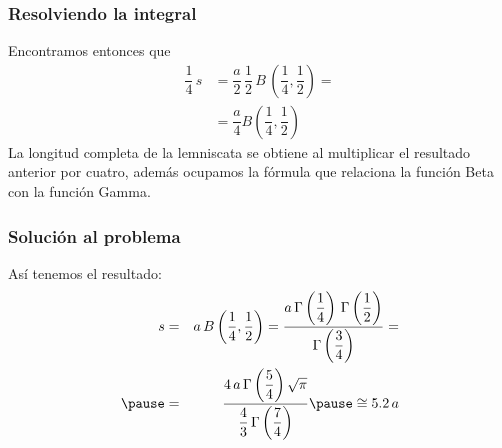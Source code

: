 \documentclass[12pt]{beamer}
\begin{document}
\begin{frame}
\frametitle{Resolviendo la integral}
Encontramos entonces que
\begin{align*}
\dfrac{1}{4} \, s &= \dfrac{a}{2} \, \dfrac{1}{2} \, B \, \left(\dfrac{1}{4}, \dfrac{1}{2} \right) = \\[1em]
&= \dfrac{a}{4} B\left(\dfrac{1}{4}, \dfrac{1}{2} \right)
\end{align*}
\pause
\fontsize{12}{12}\selectfont
La longitud completa de la lemniscata se obtiene al multiplicar el resultado anterior por cuatro, además ocupamos la fórmula que relaciona la función Beta con la función Gamma.
\end{frame}
\begin{frame}
\frametitle{Solución al problema}
Así tenemos el resultado:
\begin{eqnarray*}
s &=& a \, B\left(\dfrac{1}{4}, \dfrac{1}{2} \right) = \dfrac{a \, \Gamma \left( \dfrac{1}{4} \right) \, \Gamma \left( \dfrac{1}{2} \right) }{\Gamma \left( \dfrac{3}{4} \right)} = \\ \pause
&=& \dfrac{4 \, a \, \Gamma \left( \dfrac{5}{4} \right) \sqrt{\pi}}{\dfrac{4}{3} \, \Gamma \left( \dfrac{7}{4} \right)} \pause \cong 5.2 \, a
\end{eqnarray*}
\end{frame}
\end{document}
